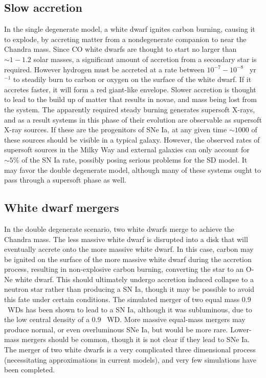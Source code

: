 \documentclass{nature1}
\begin{document}
\subsection{Slow accretion}
In the single degenerate model, a white dwarf ignites
carbon burning, causing it to explode, by accreting matter from a
nondegenerate companion to near the Chandra mass.
Since CO white dwarfs are thought to start no larger than $\sim 1-1.2$
solar masses, a significant amount of accretion from a secondary star
is required.  However hydrogen must be
accreted at a rate between $10^{-7}-10^{-8}$ \Msun\ yr$^{-1}$ to
steadily burn to carbon or oxygen on the surface of the white
dwarf\citep{1982ApJ...253..798N}.  If it accretes faster, it will form
a red giant-like envelope.  Slower accretion is thought to lead to the
build up of matter that results in novae, and mass being lost from the
system.  The apparently required steady burning generates supersoft
X-rays, and as a result systems in this phase of their evolution are
observable as supersoft X-ray sources\citep{1992A&A...262...97V}.  If
these are the progenitors of SNe Ia, at any given time $\sim 1000$ of
these sources should be visible in a typical galaxy.  However, the
observed rates of supersoft sources in the Milky Way and external
galaxies can only account for $\sim 5\%$ of the SN Ia
rate\citep{2010ApJ...712..728D, 2010Natur.463..924G}, possibly posing serious problems for the SD model.  It may favor
the double degenerate model, although many of these systems ought to
pass through a supersoft phase as well\citep{2010ApJ...719..474D}.

\subsection{White dwarf mergers}
In the double degenerate scenario, two white dwarfs merge to achieve
the Chandra mass\citep{1984ApJS...54..335I,1984ApJ...277..355W}.  The
less massive white dwarf is disrupted into a disk that will eventually
accrete onto the more massive white dwarf\citep{1990ApJ...348..647B}.
In this case, carbon may be ignited on the surface of the more massive
white dwarf during the accretion process, resulting in non-explosive
carbon burning, converting the star to an O-Ne white dwarf.  This
should ultimately undergo accretion induced collapse to a neutron star
rather than producing a SN Ia\citep{1985A&A...150L..21S}, though it
may be possible to avoid this fate under certain
conditions\citep{2007MNRAS.380..933Y}.  The simulated merger of two
equal mass 0.9 \Msun\ WDs has been shown to lead to a SN Ia, although
it was subluminous\citep{2010Natur.463...61P}, due to the low central
density of a 0.9 \Msun\ WD.  More massive equal-mass mergers may
produce normal, or even overluminous SNe Ia, but would be more rare.
Lower-mass mergers should be common, though it is not clear if they
lead to SNe Ia\citep{2010ApJ...722L.157V}.  The merger of two white
dwarfs is a very complicated three dimensional process (necessitating
approximations in current models), and very few simulations have been
completed.
\end{document}
